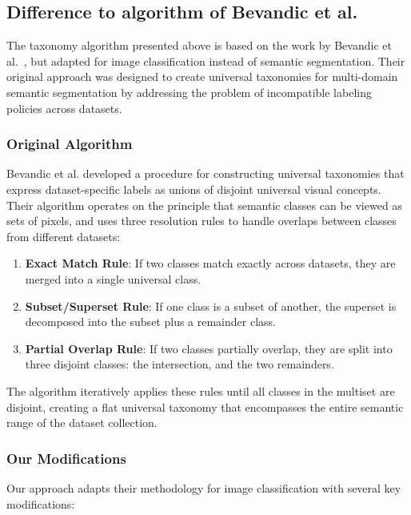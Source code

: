 \subsection{Difference to algorithm of Bevandic et al.}

The taxonomy algorithm presented above is based on the work by Bevandic et al.~\cite{bevandic_weakly_2024}, but adapted for image classification instead of semantic segmentation.
Their original approach was designed to create universal taxonomies for multi-domain semantic segmentation
by addressing the problem of incompatible labeling policies across datasets.

\subsubsection{Original Algorithm}

Bevandic et al. developed a procedure for constructing universal taxonomies
that express dataset-specific labels as unions of disjoint universal visual concepts.
Their algorithm operates on the principle that semantic classes can be viewed as sets of pixels,
and uses three resolution rules to handle overlaps between classes from different datasets:

\begin{enumerate}
      \item \textbf{Exact Match Rule}: If two classes match exactly across datasets, they are merged into a single universal class.
      \item \textbf{Subset/Superset Rule}: If one class is a subset of another, the superset is decomposed into the subset plus a remainder class.
      \item \textbf{Partial Overlap Rule}: If two classes partially overlap, they are split into three disjoint classes: the intersection, and the two remainders.
\end{enumerate}

The algorithm iteratively applies these rules until all classes in the multiset are disjoint,
creating a flat universal taxonomy that encompasses the entire semantic range of the dataset collection.

\subsubsection{Our Modifications}

Our approach adapts their methodology for image classification with several key modifications:

